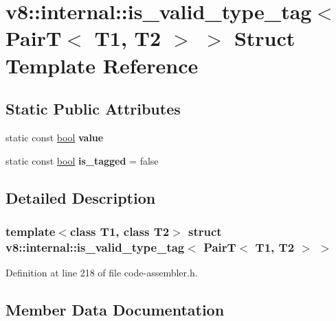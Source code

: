 \hypertarget{structv8_1_1internal_1_1is__valid__type__tag_3_01PairT_3_01T1_00_01T2_01_4_01_4}{}\section{v8\+:\+:internal\+:\+:is\+\_\+valid\+\_\+type\+\_\+tag$<$ PairT$<$ T1, T2 $>$ $>$ Struct Template Reference}
\label{structv8_1_1internal_1_1is__valid__type__tag_3_01PairT_3_01T1_00_01T2_01_4_01_4}
\subsection*{Static Public Attributes}
\begin{DoxyCompactItemize}
\item 
static const \mbox{\hyperlink{classbool}{bool}} {\bfseries value}
\item 
\mbox{\label{structv8_1_1internal_1_1is__valid__type__tag_3_01PairT_3_01T1_00_01T2_01_4_01_4_a4c5b34b9cfe3d3c8c491221bbdcf0cfe}} 
static const \mbox{\hyperlink{classbool}{bool}} {\bfseries is\+\_\+tagged} = false
\end{DoxyCompactItemize}


\subsection{Detailed Description}
\subsubsection*{template$<$class T1, class T2$>$\newline
struct v8\+::internal\+::is\+\_\+valid\+\_\+type\+\_\+tag$<$ Pair\+T$<$ T1, T2 $>$ $>$}



Definition at line 218 of file code-\/assembler.\+h.



\subsection{Member Data Documentation}
\mbox{\label{structv8_1_1internal_1_1is__valid__type__tag_3_01PairT_3_01T1_00_01T2_01_4_01_4_a51af051376da6c9fa366371111cb8924}} 
